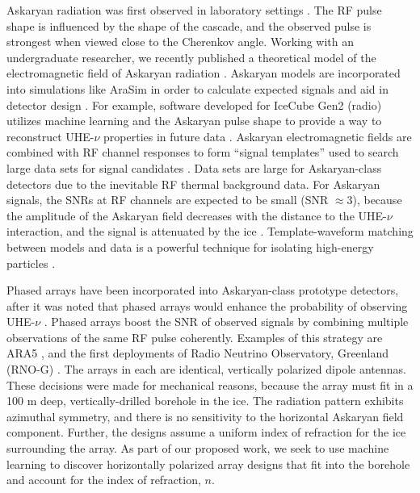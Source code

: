 \documentclass[../../main.tex]{subfiles}
\begin{document}
Askaryan radiation was first observed in laboratory settings \cite{saltzberg,10.1103/PhysRevD.74.043002,ask_ice}.  The RF pulse shape is influenced by the shape of the cascade, and the observed pulse is strongest when viewed close to the Cherenkov angle.  Working with an undergraduate researcher, we recently published a theoretical model of the electromagnetic field of Askaryan radiation \cite{PhysRevD.105.123019}. Askaryan models are incorporated into simulations like AraSim in order to calculate expected signals and aid in detector design \cite{dookayka2011characterizing,testbed,10.1140/epjc/s10052-020-7612-8}.  For example, software developed for IceCube Gen2 (radio) utilizes machine learning and the Askaryan pulse shape to provide a way to reconstruct UHE-$\nu$ properties in future data \cite{10.1140/epjc/s10052-019-6971-5,10.1088/1748-0221/15/09/p09039,IFT}.  Askaryan electromagnetic fields are combined with RF channel responses to form ``signal templates'' used to search large data sets for signal candidates \cite{10.1088/1475-7516/2020/03/053,10.1016/j.astropartphys.2014.09.002}.  Data sets are large for Askaryan-class detectors due to the inevitable RF thermal background data.  For Askaryan signals, the SNRs at RF channels are expected to be small (SNR $\approx 3$), because the amplitude of the Askaryan field decreases with the distance to the UHE-$\nu$ interaction, and the signal is attenuated by the ice \cite{10.3189/2015jog14j214,Barwick:2018497,ALLISON201963}.  Template-waveform matching between models and data is a powerful technique for isolating high-energy particles \cite{10.1016/j.astropartphys.2015.04.002,10.1016/j.astropartphys.2014.09.002,barwick2016radio,10.1088/1475-7516/2020/03/053}. \\ \vspace{2.5mm}

Phased arrays have been incorporated into Askaryan-class prototype detectors, after it was noted that phased arrays would enhance the probability of observing UHE-$\nu$ \cite{Vieregg_2016,AVVA201746}.  Phased arrays boost the SNR of observed signals by combining multiple observations of the same RF pulse coherently.  Examples of this strategy are ARA5 \cite{PhysRevD.105.122006}, and the first deployments of Radio Neutrino Observatory, Greenland (RNO-G) \cite{rno}.  The arrays in each are identical, vertically polarized dipole antennas.  These decisions were made for mechanical reasons, because the array must fit in a 100 m deep, vertically-drilled borehole in the ice.  The radiation pattern exhibits azimuthal symmetry, and there is no sensitivity to the horizontal Askaryan field component.  Further, the designs assume a uniform index of refraction for the ice surrounding the array.  As part of our proposed work, we seek to use machine learning to discover horizontally polarized array designs that fit into the borehole and account for the index of refraction, $n$.  \\ \vspace{2.5mm}
\end{document}
